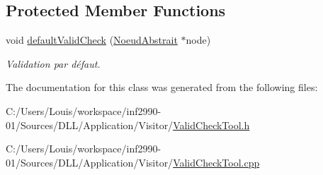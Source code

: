 \subsection*{Protected Member Functions}
\begin{DoxyCompactItemize}
\item 
\hypertarget{group__inf2990_ga58a361b0ca91a2b7acb338d39bc0172a}{}void \hyperlink{group__inf2990_ga58a361b0ca91a2b7acb338d39bc0172a}{default\+Valid\+Check} (\hyperlink{class_noeud_abstrait}{Noeud\+Abstrait} $\ast$node)\label{group__inf2990_ga58a361b0ca91a2b7acb338d39bc0172a}

\begin{DoxyCompactList}\small\item\em Validation par défaut. \end{DoxyCompactList}\end{DoxyCompactItemize}


The documentation for this class was generated from the following files\+:\begin{DoxyCompactItemize}
\item 
C\+:/\+Users/\+Louis/workspace/inf2990-\/01/\+Sources/\+D\+L\+L/\+Application/\+Visitor/\hyperlink{_valid_check_tool_8h}{Valid\+Check\+Tool.\+h}\item 
C\+:/\+Users/\+Louis/workspace/inf2990-\/01/\+Sources/\+D\+L\+L/\+Application/\+Visitor/\hyperlink{_valid_check_tool_8cpp}{Valid\+Check\+Tool.\+cpp}\end{DoxyCompactItemize}
